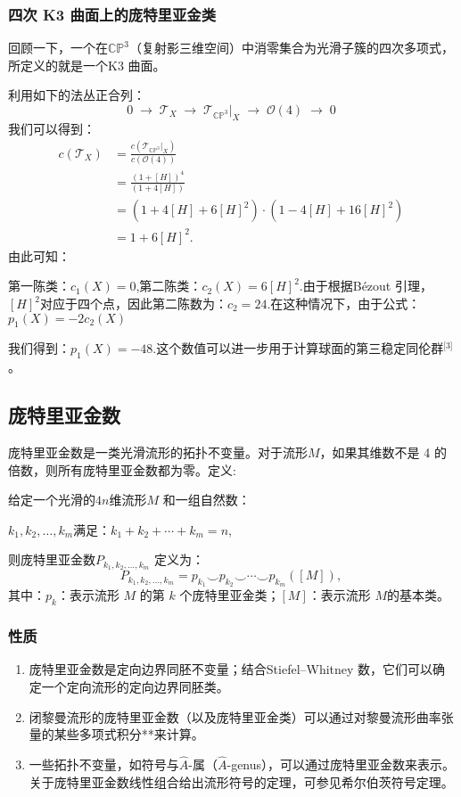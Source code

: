 \subsubsection{四次 K3 曲面上的庞特里亚金类}
回顾一下，一个在$\mathbb{CP}^3$（复射影三维空间）中消零集合为光滑子簇的四次多项式，所定义的就是一个K3 曲面。

利用如下的法丛正合列：
$$
0 \;\longrightarrow\; \mathcal{T}_X
\;\longrightarrow\; \mathcal{T}_{\mathbb{CP}^3}|_X
\;\longrightarrow\; \mathcal{O}(4)
\;\longrightarrow\; 0~
$$
我们可以得到：
$$
\begin{aligned}
c(\mathcal{T}_X)
&= \frac{c(\mathcal{T}_{\mathbb{CP}^3}|_X)}{c(\mathcal{O}(4))} \\[6pt]
&= \frac{(1 + [H])^4}{(1 + 4[H])} \\[6pt]
&= (1 + 4[H] + 6[H]^2) \cdot (1 - 4[H] + 16[H]^2) \\[6pt]
&= 1 + 6[H]^2.
\end{aligned}~
$$
由此可知：

第一陈类：$c_1(X) = 0$,第二陈类：$c_2(X) = 6[H]^2$.由于根据Bézout 引理，$[H]^2$对应于四个点，因此第二陈数为：$c_2 = 24$.在这种情况下，由于公式：$p_1(X) = -2c_2(X)$

我们得到：$p_1(X) = -48$.这个数值可以进一步用于计算球面的第三稳定同伦群\(^\text{[3]}\)。
\subsection{庞特里亚金数}
庞特里亚金数是一类光滑流形的拓扑不变量。对于流形$M$，如果其维数不是 4 的倍数，则所有庞特里亚金数都为零。定义:

给定一个光滑的$4n$维流形$M$ 和一组自然数：

$k_1, k_2, \ldots, k_m$满足：$k_1 + k_2 + \cdots + k_m = n$,

则庞特里亚金数$P_{k_1, k_2, \ldots, k_m}$ 定义为：
$$
P_{k_1, k_2, \ldots, k_m}
= p_{k_1} \smile p_{k_2} \smile \cdots \smile p_{k_m}([M]),~
$$
其中：$p_k$：表示流形 $M$ 的第 $k$ 个庞特里亚金类；$[M]$：表示流形 $M$的基本类。
\subsubsection{性质}
\begin{enumerate}
\item 庞特里亚金数是定向边界同胚不变量；结合Stiefel–Whitney 数，它们可以确定一个定向流形的定向边界同胚类。
\item 闭黎曼流形的庞特里亚金数（以及庞特里亚金类）可以通过对黎曼流形曲率张量的某些多项式积分**来计算。
\item 一些拓扑不变量，如符号与$\hat{A}$-属（$\hat{A}$-genus），可以通过庞特里亚金数来表示。关于庞特里亚金数线性组合给出流形符号的定理，可参见希尔伯茨符号定理。
\end{enumerate}
